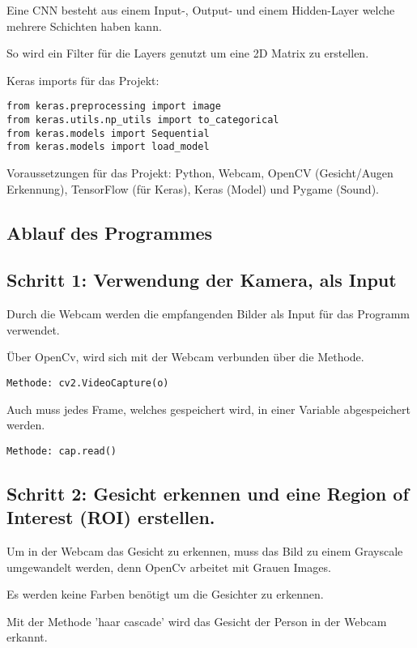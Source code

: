 Eine CNN besteht aus einem Input-, Output- und einem Hidden-Layer welche mehrere Schichten haben kann.

So wird ein Filter für die Layers genutzt um eine 2D Matrix zu erstellen. 

\newpage
Keras imports für das Projekt:
\begin{lstlisting}
from keras.preprocessing import image
from keras.utils.np_utils import to_categorical
from keras.models import Sequential
from keras.models import load_model
\end{lstlisting}

Voraussetzungen für das Projekt:
Python, Webcam, OpenCV (Gesicht/Augen Erkennung), TensorFlow (für Keras), Keras (Model) und Pygame (Sound).\cite{b1}


\subsection{Ablauf des Programmes}

\subsection{Schritt 1: Verwendung der Kamera, als Input}


Durch die Webcam werden die empfangenden Bilder als Input für das Programm verwendet. 

Über OpenCv, wird sich mit der Webcam verbunden über die Methode.
\begin{lstlisting}
Methode: cv2.VideoCapture(o) 
\end{lstlisting}

Auch muss jedes Frame, welches gespeichert wird, in einer Variable abgespeichert werden.
\begin{lstlisting}
Methode: cap.read()
\end{lstlisting}


\subsection{Schritt 2: Gesicht erkennen und eine Region of Interest (ROI) erstellen.}

Um in der Webcam das Gesicht zu erkennen, muss das Bild zu einem Grayscale umgewandelt werden, denn OpenCv arbeitet mit Grauen Images. 

Es werden keine Farben benötigt um die Gesichter zu erkennen. 

Mit der Methode 'haar cascade' wird das Gesicht der Person in der Webcam erkannt. 


